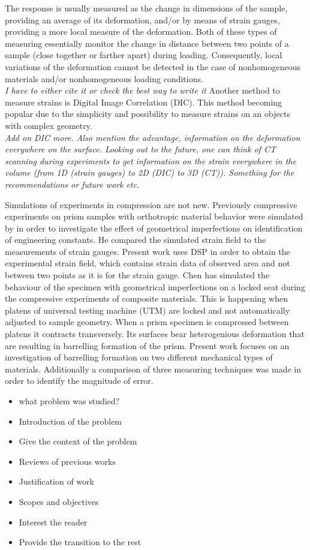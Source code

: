 \documentclass[review]{elsarticle}
\begin{document}
The response is usually measured as the change in dimensions of the sample, 
providing an average of its deformation, and/or by means of strain gauges, 
providing a more local measure of the deformation. Both of these types of
measuring essentially monitor the change in distance between two points of a sample 
(close together or farther apart) during loading.
Consequently, local variations of the deformation cannot be detected in the case
of nonhomogeneous materials and/or nonhomogeneous loading conditions.
\\\textit{\color {red} I have to either cite it or check the best way to write
it} 
Another method to measure strains is Digital Image Correlation (DIC). This method becoming popular due to
the simplicity and possibility to measure strains on an objects with complex
geometry.
\\\textit{\color {red} Add on DIC more. Also mention the advantage, information on the deformation everywhere on the surface.
Looking out to the future, one can think of CT scanning during experiments to get information on the strain everywhere in the volume (from 1D (strain gauges) to 2D (DIC) to 3D (CT)).  Something for the recommendations or future work etc.} 

Simulations of experiments in compression are not new. Previously compressive
experiments on prism samples with orthotropic material behavior were simulated
by \cite{Toftegaard1999849} in order to investigate the effect of geometrical imperfections on identification of engineering constants. 
He compared the simulated strain field to the measurements of strain gauges. 
Present work uses DSP in order to obtain the experimental strain field, which
contains strain data of observed area and not between two points as it is for the strain gauge. 
Chen \cite{Chen001} has simulated the behaviour of the specimen with geometrical
imperfections on a locked  seat during the compressive experiments
of composite materials. This is happening when platens of universal testing
machine (UTM) are locked and not automatically adjusted to sample geometry.
When a prism specimen is compressed between platens it contracts transversely.
Its surfaces bear heterogenious deformation that are resulting in barrelling
formation of the prism. 
Present work focuses on an investigation of
barrelling formation on two different mechanical types of materials. Additionally a comparison of three measuring techniques was made in order to identify the magnitude of error.

\begin{itemize}
\color{red}  



\item what problem was studied?
\item Introduction of the problem
\item Give the context of the problem
\item Reviews of previous works
\item Justification of work
\item Scopes and objectives
\item Interest the reader
\item Provide the transition to the rest
\end{itemize}
\end{document}
